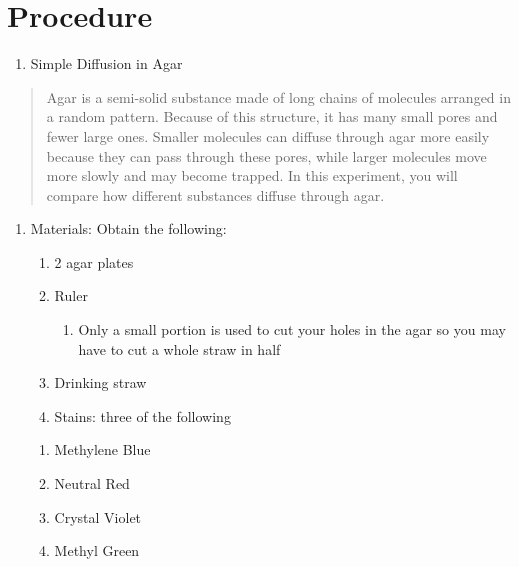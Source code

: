 \documentclass[
  letterpaper,
  DIV=11,
  numbers=noendperiod]{scrreprt}
\providecommand{\tightlist}{%
  \setlength{\itemsep}{0pt}\setlength{\parskip}{0pt}}
\begin{document}
\textbf{\hfill\break
}

\section{\texorpdfstring{\textbf{Procedure}}{Procedure}}\label{procedure-1}

\begin{enumerate}
\def\labelenumi{\Alph{enumi}.}
\tightlist
\item
  Simple Diffusion in Agar
\end{enumerate}

\begin{quote}
Agar is a semi-solid substance made of long chains of molecules arranged
in a random pattern. Because of this structure, it has many small pores
and fewer large ones. Smaller molecules can diffuse through agar more
easily because they can pass through these pores, while larger molecules
move more slowly and may become trapped. In this experiment, you will
compare how different substances diffuse through agar.
\end{quote}

\begin{enumerate}
\def\labelenumi{\arabic{enumi}.}
\item
  Materials: Obtain the following:

  \begin{enumerate}
  \def\labelenumii{\alph{enumii}.}
  \item
    2 agar plates
  \item
    Ruler

    \begin{enumerate}
    \def\labelenumiii{\roman{enumiii}.}
    \tightlist
    \item
      Only a small portion is used to cut your holes in the agar so you
      may have to cut a whole straw in half
    \end{enumerate}
  \item
    Drinking straw
  \item
    Stains: three of the following
  \end{enumerate}

  \begin{enumerate}
  \def\labelenumii{\arabic{enumii}.}
  \item
    Methylene Blue
  \item
    Neutral Red
  \item
    Crystal Violet
  \item
    Methyl Green
  \end{enumerate}
\end{enumerate}
\end{document}

